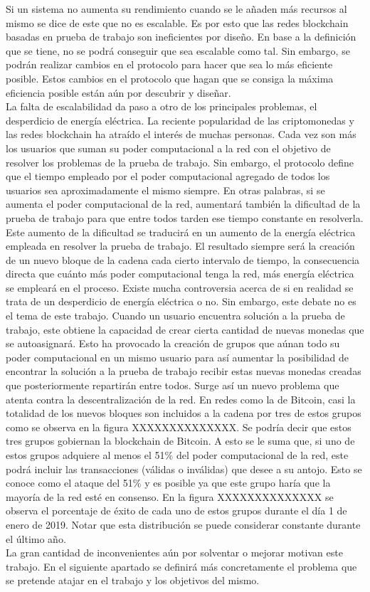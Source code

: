 Si un sistema no aumenta su rendimiento cuando se le añaden más recursos al mismo se dice de este que no es escalable. Es por esto que las redes blockchain basadas en prueba de trabajo son ineficientes por diseño. En base a la definición que se tiene, no se podrá conseguir que sea escalable como tal. Sin embargo, se podrán realizar cambios en el protocolo para hacer que sea lo más eficiente posible. Estos cambios en el protocolo que hagan que se consiga la máxima eficiencia posible están aún por descubrir y diseñar. \\
La falta de escalabilidad da paso a otro de los principales problemas, el desperdicio de energía eléctrica. La reciente popularidad de las criptomonedas y las redes blockchain ha atraído el interés de muchas personas. Cada vez son más los usuarios que suman su poder computacional a la red con el objetivo de resolver los problemas de la prueba de trabajo. Sin embargo, el protocolo define que el tiempo empleado por el poder computacional agregado de todos los usuarios sea aproximadamente el mismo siempre. En otras palabras, si se aumenta el poder computacional de la red, aumentará también la dificultad de la prueba de trabajo para que entre todos tarden ese tiempo constante en resolverla. Este aumento de la dificultad se traducirá en un aumento de la energía eléctrica empleada en resolver la prueba de trabajo. El resultado siempre será la creación de un nuevo bloque de la cadena cada cierto intervalo de tiempo, la consecuencia directa que cuánto más poder computacional tenga la red, más energía eléctrica se empleará en el proceso. Existe mucha controversia acerca de si en realidad se trata de un desperdicio de energía eléctrica o no. Sin embargo, este debate no es el tema de este trabajo.
Cuando un usuario encuentra solución a la prueba de trabajo, este obtiene la capacidad de crear cierta cantidad de nuevas monedas que se autoasignará. Esto ha provocado la creación de grupos que aúnan todo su poder computacional en un mismo usuario para así aumentar la posibilidad de encontrar la solución a la prueba de trabajo recibir estas nuevas monedas creadas que posteriormente repartirán entre todos. Surge así un nuevo problema que atenta contra la descentralización de la red. En redes como la de Bitcoin, casi la totalidad de los nuevos bloques son incluidos a la cadena por tres de estos grupos como se observa en la figura XXXXXXXXXXXXXX. Se podría decir que estos tres grupos gobiernan la blockchain de Bitcoin. A esto se le suma que, si uno de estos grupos adquiere al menos el 51\% del poder computacional de la red, este podrá incluir las transacciones (válidas o inválidas) que desee a su antojo. Esto se conoce como el ataque del 51\% y es posible ya que este grupo haría que la mayoría de la red esté en consenso. En la figura XXXXXXXXXXXXXX se observa el porcentaje de éxito de cada uno de estos grupos durante el día 1 de enero de 2019. Notar que esta distribución se puede considerar constante durante el último año. \\
La gran cantidad de inconvenientes aún por solventar o mejorar motivan este trabajo. En el siguiente apartado se definirá más concretamente el problema que se pretende atajar en el trabajo y los objetivos del mismo.


